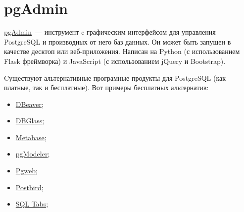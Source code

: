 \section{pgAdmin}

\href{https://www.pgadmin.org/}{pgAdmin}~--- инструмент c графическим интерфейсом для управления PostgreSQL и производных от него баз данных. Он может быть запущен в качестве десктоп или веб-приложения. Написан на Python (с использованием Flask фреймворка) и JavaScript (с использованием jQuery и Bootstrap).

Cуществуют альтернативные програмные продукты для PostgreSQL (как платные, так и бесплатные). Вот примеры бесплатных альтернатив:

\begin{itemize}
  \item \href{http://dbeaver.jkiss.org/}{DBeaver};
  \item \href{http://dbglass.web-pal.com/}{DBGlass};
  \item \href{http://www.metabase.com/}{Metabase};
  \item \href{http://pgmodeler.com.br/}{pgModeler};
  \item \href{http://sosedoff.github.io/pgweb/}{Pgweb};
  \item \href{https://github.com/Paxa/postbird}{Postbird};
  \item \href{http://www.sqltabs.com/}{SQL Tabs};
\end{itemize}
